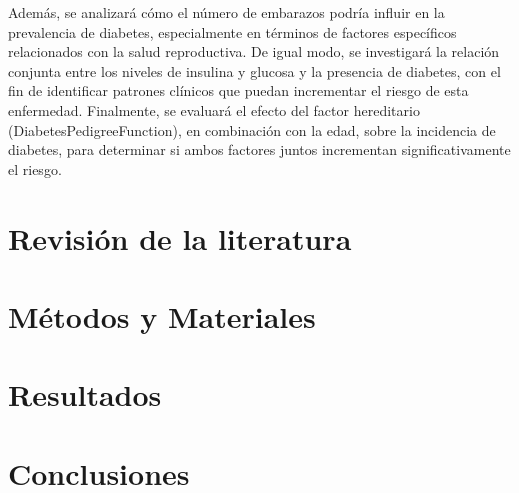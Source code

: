 \documentclass[12pt, oneside openany]{apa7}
\begin{document}
Además, se analizará cómo el número de embarazos podría influir en la prevalencia de diabetes, especialmente en términos de factores específicos relacionados con la salud reproductiva. De igual modo, se investigará la relación conjunta entre los niveles de insulina y glucosa y la presencia de diabetes, con el fin de identificar patrones clínicos que puedan incrementar el riesgo de esta enfermedad. Finalmente, se evaluará el efecto del factor hereditario (DiabetesPedigreeFunction), en combinación con la edad, sobre la incidencia de diabetes, para determinar si ambos factores juntos incrementan significativamente el riesgo.

\section{Revisión de la literatura}


\section{Métodos y Materiales}


\section{Resultados}

\section{Conclusiones}


\nocite{*}
\printbibliography
\end{document}
